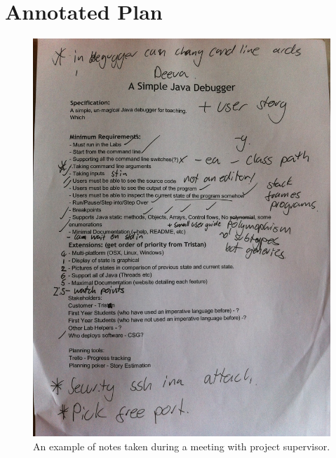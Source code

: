 \documentclass[11pt, a4paper]{article}
\begin{document}
\section{Annotated Plan}
\begin{figure}[h!]
\centering
\includegraphics[width=\textwidth]{annotatedreport.jpg}
\caption{An example of notes taken during a meeting with project supervisor.}
\end{figure}
\end{document}
